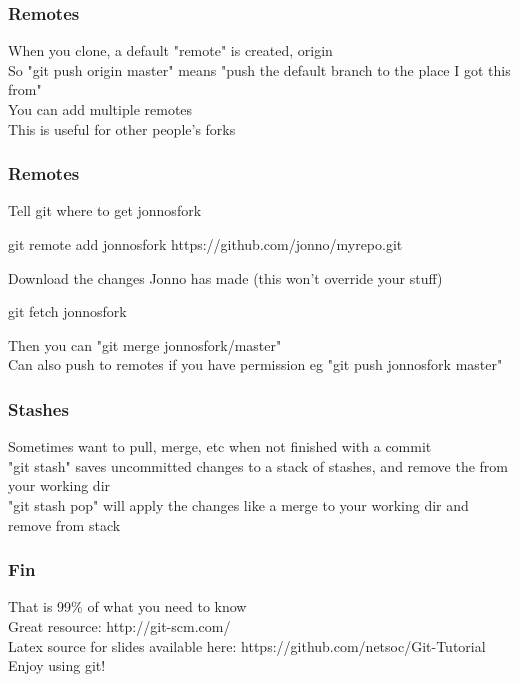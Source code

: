 \documentclass[xcolor=dvipsnames]{beamer}
\begin{document}
\begin{frame}
    \frametitle{Remotes}

    When you clone, a default "remote" is created, origin\\
    So "git push origin master" means "push the default branch to the place I got this from"\\
    You can add multiple remotes\\
    This is useful for other people's forks
\end{frame}

\begin{frame}
    \frametitle{Remotes}
    Tell git where to get jonnosfork
    \begin{block}{}
        git remote add jonnosfork https://github.com/jonno/myrepo.git
    \end{block}

    Download the changes Jonno has made (this won't override your stuff)
    \begin{block}{}
        git fetch jonnosfork     
    \end{block}
    
    Then you can "git merge jonnosfork/master"\\
    Can also push to remotes if you have permission eg "git push jonnosfork master"
\end{frame}

\begin{frame}
    \frametitle{Stashes}
    
    Sometimes want to pull, merge, etc when not finished with a commit\\
    "git stash" saves uncommitted changes to a stack of stashes, and remove the from your working dir\\
    "git stash pop" will apply the changes like a merge to your working dir and remove from stack\\
\end{frame}

\begin{frame}
    \frametitle{Fin}

     That is 99\% of what you need to know\\
     Great resource: http://git-scm.com/\\
     Latex source for slides available here: https://github.com/netsoc/Git-Tutorial\\
     Enjoy using git!
\end{frame}
\end{document}
